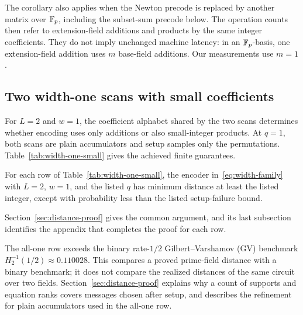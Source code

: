 The corollary also applies when the Newton precode is replaced by another
matrix over $\mathbb F_p$, including the subset-sum precode below. The operation
counts then refer to extension-field additions and products by the same
integer coefficients. They do not imply unchanged machine latency:
in an $\mathbb F_p$-basis, one extension-field addition uses $m$ base-field
additions. Our measurements use $m=1$.

\subsection{Two width-one scans with small coefficients}

For $L=2$ and $w=1$, the coefficient alphabet shared by the two scans
determines whether encoding uses only additions or also small-integer
products. At $q=1$, both scans are plain accumulators and setup samples
only the permutations. Table~\ref{tab:width-one-small} gives the achieved
finite guarantees.

\begin{theorem}\label{thm:width-one-small}
For each row of Table~\ref{tab:width-one-small}, the encoder
in~\eqref{eq:width-family} with $L=2$, $w=1$, and the listed $q$ has
minimum distance at least the listed integer, except with probability
less than the listed setup-failure bound.
\end{theorem}

Section~\ref{sec:distance-proof} gives the common argument, and its
last subsection identifies the appendix that completes the proof for
each row.

\begin{table}[t]
\centering
\caption{Proved width-one guarantees for the Newton precode $B_8$ and
two permutations. Failure exponents are truncated toward zero, so the
stated bounds are conservative. Times are measured as described in
Section~\ref{sec:matched-timings}. These are achieved points, not
optimal frontiers.}
\label{tab:width-one-small}

\end{table}

The all-one row exceeds the binary rate-$1/2$ Gilbert--Varshamov (GV)
benchmark $H_2^{-1}(1/2)\approx0.110028$. This compares a proved
prime-field distance with a binary benchmark; it does not compare the
realized distances of the same circuit over two fields.
Section~\ref{sec:distance-proof} explains why a count of supports and
equation ranks covers messages chosen after setup, and describes the
refinement for plain accumulators used in the all-one row.

